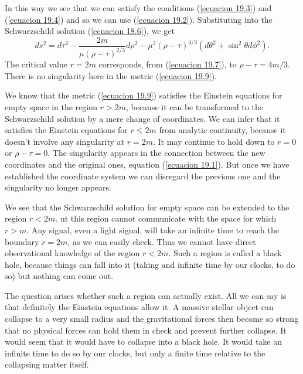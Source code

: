 In this way we see that we can satisfy the conditions (\ref{ecuacion 19.3}) and (\ref{ecuacion 19.4}) and so we can use 
(\ref{ecuacion 19.2}). Substituting into the Schwarzschild solution (\ref{ecuacion 18.6}), we get
\begin{equation}
 \label{ecuacion 19.9}
 ds^2 = d\tau^2 - \frac{2 m}{\mu (\rho - \tau)^{2/3}} d\rho^2 - \mu^2 (\rho - \tau)^{4/3}
 \left( d\theta^2 + \sin^2 \theta d\phi^2 \right).
\end{equation}
The critical value $r = 2 m$ corresponds, from (\ref{ecuacion 19.7}), to $\rho - \tau = 4 m/3$. There is no singularity 
here in the metric (\ref{ecuacion 19.9}).

We know that the metric (\ref{ecuacion 19.9}) satisfies the Einstein equations for empty space in the region $r > 2m$, 
because it can be transformed to the Schwarzschild solution by a mere change of coordinates. We can  infer that it 
satisfies the Einstein equations for $r \le 2m $ from analytic continuity, because it doesn't involve any singularity 
at $r=2m$. It may continue to hold down to $r=0$ or $\rho - \tau = 0$. The singularity appears in the connection 
between the new coordinates and the original ones, equation (\ref{ecuacion 19.1}). But once we have established the 
coordinate system we can disregard the previous one and the singularity no longer appears.

We see that the Schwarzschild solution for empty space can be extended to the region $r<2m$. ut this region cannot 
communicate with the space for which $r>m$. Any signal, even a light signal, will take an infinite time to reach the 
boundary $r=2m$, as we can easily check. Thus we cannot have direct observational knowledge of the region $r < 2m$. 
Such a region is called a black hole, because things can fall into it (taking and infinite time by our clocks, to do 
so) but nothing can come out.

The question arises whether such a region can actually exist. All we can say is that definitely the Einstein equations 
allow it. A massive stellar object can collapse to a very small radius and the gravitational forces then become so 
strong that no physical forces can hold them in check and prevent further collapse. It would seem that it would have to 
collapse into a black hole. It would take an infinite time to do so by our clocks, but only a finite time relative to 
the collapsing matter itself.






